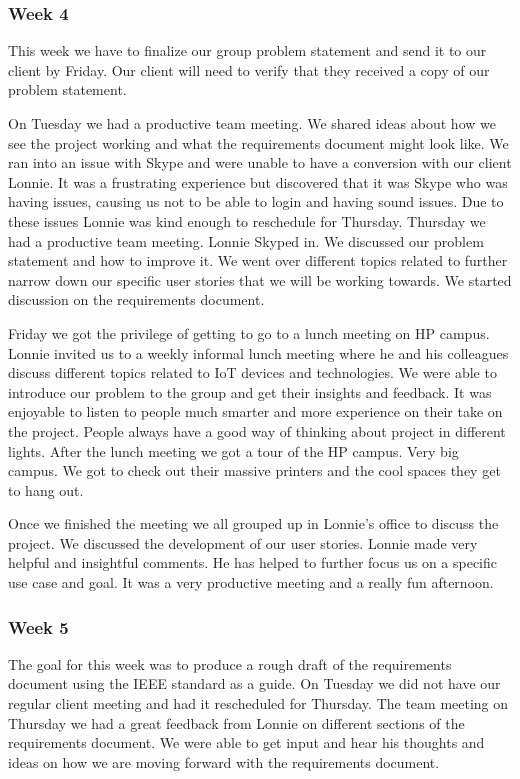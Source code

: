 \documentclass[draftclsnofoot, onecolumn, compsoc, 10pt]{IEEEtran}
\begin{document}
\subsubsection{Week 4}
This week we have to finalize our group problem statement and send it to our client by Friday. Our client will need to verify that they received a copy of our problem statement.

On Tuesday we had a productive team meeting. We shared ideas about how we see the project working and what the requirements document might look like. We ran into an issue with Skype and were unable to have a conversion with our client Lonnie. It was a frustrating experience but discovered that it was Skype who was having issues, causing us not to be able to login and having sound issues. Due to these issues Lonnie was kind enough to reschedule for Thursday.
Thursday we had a productive team meeting. Lonnie Skyped in. We discussed our problem statement and how to improve it. We went over different topics related to further narrow down our specific user stories that we will be working towards.  We started discussion on the requirements document.

Friday we got the privilege of getting to go to a lunch meeting on HP campus. Lonnie invited us to a weekly informal lunch meeting where he and his colleagues discuss different topics related to IoT devices and technologies. We were able to introduce our problem to the group and get their insights and feedback. It was enjoyable to listen to people much smarter and more experience on their take on the project. People always have a good way of thinking about project in different lights. After the lunch meeting we got a tour of the HP campus. Very big campus. We got to check out their massive printers and the cool spaces they get to hang out. 

Once we finished the meeting we all grouped up in Lonnie's office to discuss the project. We discussed the development of our user stories. Lonnie made very helpful and insightful comments. He has helped to further focus us on a specific use case and goal. It was a very productive meeting and a really fun afternoon. 

\subsubsection{Week 5}
The goal for this week was to produce a rough draft of the requirements document using the IEEE standard as a guide. On Tuesday we did not have our regular client meeting and had it rescheduled for Thursday. The team meeting on Thursday we had a great feedback from Lonnie on different sections of the requirements document. We were able to get input and hear his thoughts and ideas on how we are moving forward with the requirements document.
\end{document}
